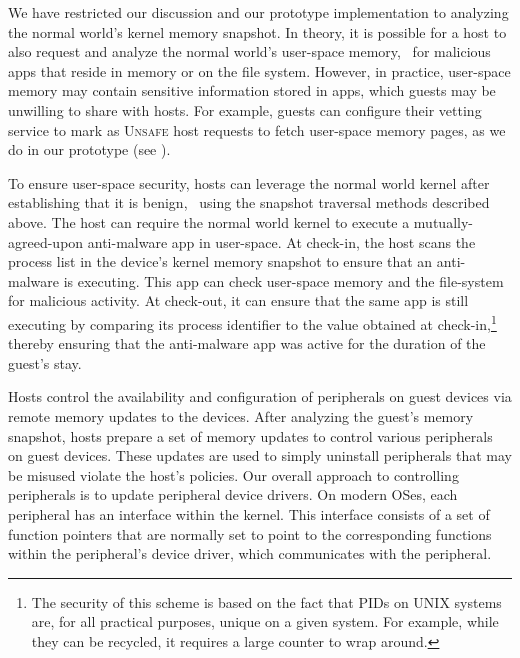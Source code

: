 We have restricted our discussion and our prototype implementation to analyzing
the normal world's kernel memory snapshot. In theory, it is possible for a host
to also request and analyze the normal world's user-space memory, \eg~for
malicious apps that reside in memory or on the file system.  However, in
practice, user-space memory may contain sensitive information stored in apps,
which guests may be unwilling to share with hosts. For example, guests can
configure their vetting service to mark as \textsc{Unsafe} host requests to
fetch user-space memory pages, as we do in our prototype (see
). 

To ensure user-space security, hosts can leverage the normal world kernel after
establishing that it is benign, \eg~using the snapshot traversal methods
described above. The host can require the normal world kernel to execute a
mutually-agreed-upon anti-malware app in user-space. At check-in, the host
scans the process list in the device's kernel memory snapshot to ensure that an
anti-malware is executing. This app can check user-space memory and the
file-system for malicious activity. At check-out, it can ensure that the same
app is still executing by comparing its process identifier to the value
obtained at check-in,\footnote{The security of this scheme is based on the fact
that PIDs on UNIX systems are, for all practical purposes, unique on a given
system. For example, while they can be recycled, it requires a large counter to
wrap around.} thereby ensuring that the anti-malware app was active for the
duration of the guest's stay.

%
Hosts control the availability and configuration of peripherals on guest
devices via remote memory updates to the devices. After analyzing the guest's
memory snapshot, hosts prepare a set of memory updates to control various
peripherals on guest devices. These updates are used to simply uninstall
peripherals that may be misused violate the host's policies. Our overall
approach to controlling peripherals is to update peripheral device drivers. On
modern OSes, each peripheral has an interface within the kernel. This interface
consists of a set of function pointers that are normally set to point to the
corresponding functions within the peripheral's device driver, which
communicates with the peripheral. 

